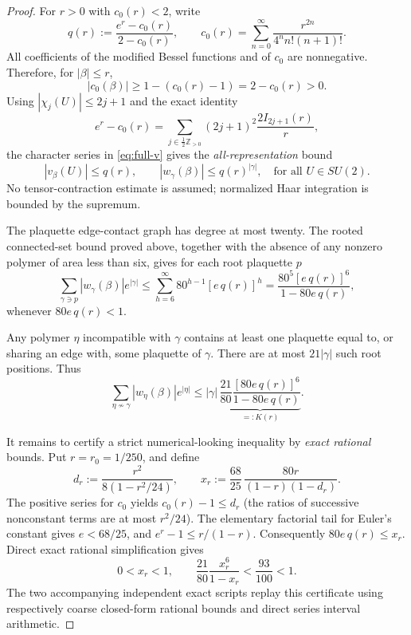 \documentclass[11pt,a4paper]{article}
\begin{document}
\begin{proof}
For $r>0$ with $c_0(r)<2$, write
\begin{equation}\label{eq:qdef}
q(r):=\frac{e^r-c_0(r)}{2-c_0(r)},\qquad
c_0(r)=\sum_{n=0}^\infty
\frac{r^{2n}}{4^n n!(n+1)!}.
\end{equation}
All coefficients of the modified Bessel functions and of
$c_0$ are nonnegative. Therefore, for $|\beta|\le r$,
\[
|c_0(\beta)|\ge1-(c_0(r)-1)=2-c_0(r)>0.
\]
Using $|\chi_j(U)|\le 2j+1$ and the exact identity
\[
e^r-c_0(r)=\sum_{j\in\frac12\mathbb Z_{>0}}
(2j+1)^2\frac{2I_{2j+1}(r)}r,
\]
the character series in \eqref{eq:full-v} gives the
\emph{all-representation} bound
\begin{equation}\label{eq:qbound}
|v_\beta(U)|\le q(r),\qquad
|w_\gamma(\beta)|\le q(r)^{|\gamma|},
\quad \text{for all }U\in SU(2).
\end{equation}
No tensor-contraction estimate is assumed; normalized
Haar integration is bounded by the supremum.

The plaquette edge-contact graph has degree at most twenty.
The rooted connected-set bound proved above,
together with the absence of any nonzero polymer of
area less than six, gives for each root plaquette $p$
\begin{equation}\label{eq:rootmajorant}
\sum_{\gamma\ni p}|w_\gamma(\beta)|e^{|\gamma|}
\le\sum_{h=6}^\infty80^{h-1}[e\,q(r)]^h
=\frac{80^5[e\,q(r)]^6}{1-80e\,q(r)},
\end{equation}
whenever $80e\,q(r)<1$.

Any polymer $\eta$ incompatible with $\gamma$ contains
at least one plaquette equal to, or sharing an edge with,
some plaquette of $\gamma$. There are at most
$21|\gamma|$ such root positions. Thus
\begin{equation}\label{eq:KPbound}
\sum_{\eta\not\sim\gamma}|w_\eta(\beta)|e^{|\eta|}
\le |\gamma|\,
\underbrace{\frac{21}{80}
 \frac{[80e\,q(r)]^6}{1-80e\,q(r)}}_{=:K(r)}.
\end{equation}

It remains to certify a strict numerical-looking
inequality by \emph{exact rational} bounds. Put
$r=r_0=1/250$, and define
\[
d_r:=\frac{r^2}{8(1-r^2/24)},\qquad
x_r:=\frac{68}{25}\,
\frac{80r}{(1-r)(1-d_r)}.
\]
The positive series for $c_0$ yields
$c_0(r)-1\le d_r$ (the ratios of successive
nonconstant terms are at most $r^2/24$).
The elementary factorial tail for Euler's constant
gives $e<68/25$, and $e^r-1\le r/(1-r)$.
Consequently $80e\,q(r)\le x_r$.
Direct exact rational simplification gives
\begin{equation}\label{eq:certificate}
0<x_r<1,\qquad
\frac{21}{80}\frac{x_r^6}{1-x_r}
<\frac{93}{100}<1.
\end{equation}
The two accompanying independent exact scripts replay
this certificate using respectively coarse closed-form
rational bounds and direct series interval arithmetic.


\end{proof}
\end{document}
